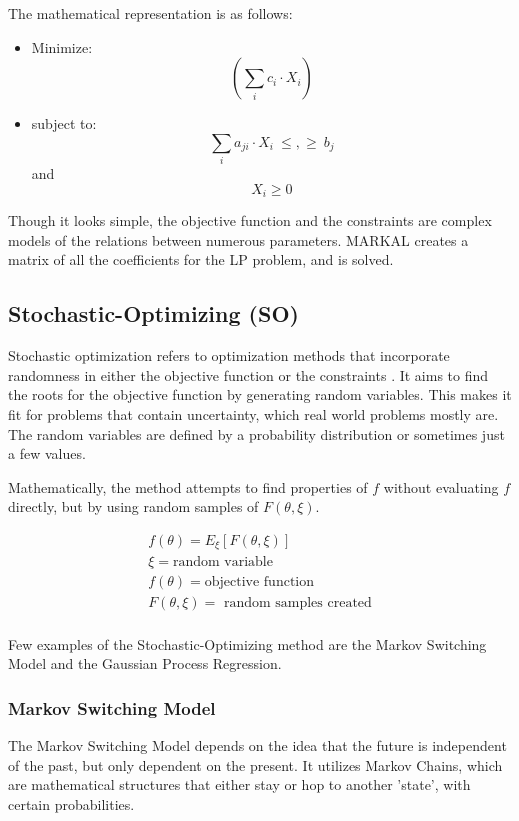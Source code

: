The mathematical representation is as follows:

\begin{itemize}
	\item[] Minimize:
	\[(\sum_i c_i \cdot X_i) \]
	\item[]subject to:
	\[ \sum_i a_{ji} \cdot X_i \ \leq , \geq \  b_j \] \quad \textrm{and} \quad \[ 	X_i \geq 0 \]
	
\end{itemize}
	
	

Though it looks simple, the objective function and the
constraints are complex models of the relations between
numerous parameters. \gls{MARKAL} creates a matrix
of all the coefficients for the \gls{LP} problem, and is
solved. 


\subsection{Stochastic-Optimizing (SO)}
Stochastic optimization refers to optimization methods
that incorporate randomness in either the objective function
or the constraints \cite{lauren_stochastic_2015}. It aims to find
the roots for the objective function by generating random variables.
This makes it fit for problems that contain uncertainty, which
real world problems mostly are. 
The random variables are defined by a probability distribution
or sometimes just a few values.

Mathematically, the method attempts to find properties of $f$ without
evaluating $f$ directly, but by using random samples of $F(\theta, \xi).$

\begin{align}
	f(\theta)= E_{\xi} [F(\theta, \xi)] \\
	\xi = \mbox{random variable} \\
	f(\theta) = \mbox{objective function} \\
	F(\theta,\xi) = \mbox{ random samples created} \\
\end{align}

Few examples of the Stochastic-Optimizing method are
the Markov Switching Model and the Gaussian Process Regression.


\subsubsection{Markov Switching Model}
The Markov Switching Model depends on the idea that
the future is independent of the past, but only dependent
on the present. It utilizes Markov Chains, which 
are mathematical structures that either stay or hop to another
'state', with certain probabilities.

